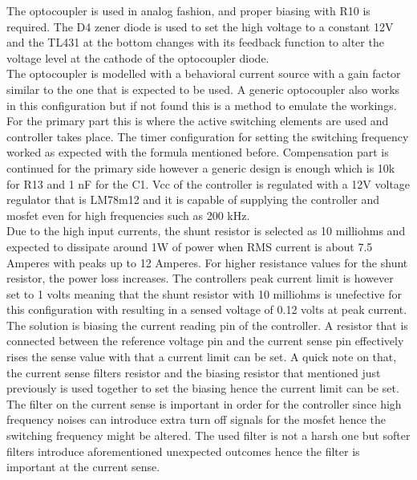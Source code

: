 \documentclass[12pt]{article}
\begin{document}
    The optocoupler is used in analog fashion, and proper biasing with R10 is required. The D4 zener diode is used to set the high voltage to a constant 12V and the TL431 at the bottom changes with its feedback function to alter the voltage level at the cathode of the optocoupler diode.\\

    The optocoupler is modelled with a behavioral current source with a gain factor similar to the one that is expected to be used. A generic optocoupler also works in this configuration but if not found this is a method to emulate the workings. \\

    For the primary part this is where the active switching elements are used and controller takes place. The timer configuration for setting the switching frequency worked as expected with the formula mentioned before. Compensation part is continued for the primary side however a generic design is enough which is 10k for R13 and 1 nF for the C1. Vcc of the controller is regulated with a 12V voltage regulator that is LM78m12 and it is capable of supplying the controller and mosfet even for high frequencies such as 200 kHz. \\

    Due to the high input currents, the shunt resistor is selected as 10 milliohms and expected to dissipate around 1W of power when RMS current is about 7.5 Amperes with peaks up to 12 Amperes. For higher resistance values for the shunt resistor, the power loss increases. The controllers peak current limit is however set to 1 volts meaning that the shunt resistor with 10 milliohms is unefective for this configuration with resulting in a sensed voltage of 0.12 volts at peak current. The solution is biasing the current reading pin of the controller. A resistor that is connected between the reference voltage pin and the current sense pin effectively rises the sense value with that a current limit can be set. A quick note on that, the current sense filters resistor and the biasing resistor that mentioned just previously is used together to set the biasing hence the current limit can be set. \\

    The filter on the current sense is important in order for the controller since high frequency noises can introduce extra turn off signals for the mosfet hence the switching frequency might be altered. The used filter is not a harsh one but softer filters introduce aforementioned unexpected outcomes hence the filter is important at the current sense. \\
\end{document}
